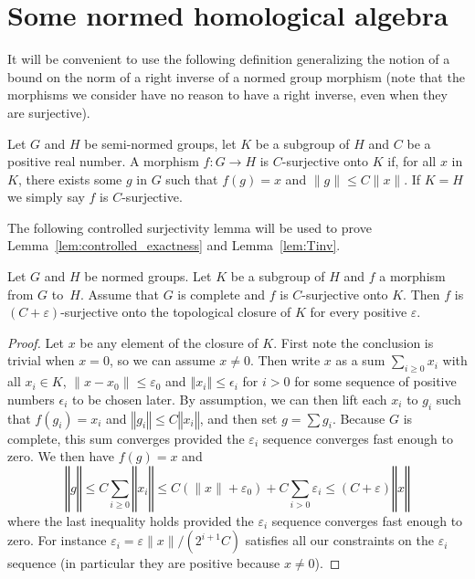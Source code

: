 \section{Some normed homological algebra}%
\label{sec:some_normed_homological_algebra}

It will be convenient to use the following definition generalizing the notion
of a bound on the norm of a right inverse of a normed group morphism (note that
the morphisms we consider have no reason to have a right inverse, even when
they are surjective).

\begin{definition}
  \label{def:surjective_with_bound}
  \leanok
  Let $G$ and $H$ be semi-normed groups, let $K$ be a subgroup of $H$ and $C$ be
  a positive real number.
  A morphism $f : G → H$ is $C$-surjective onto $K$ if, for all $x$ in $K$,
  there exists some $g$ in $G$ such that $f(g) = x$ and $\|g\| ≤ C\|x\|$.
  If $K = H$ we simply say $f$ is $C$-surjective.
\end{definition}

The following controlled surjectivity lemma will be used to prove
Lemma~\ref{lem:controlled_exactness} and Lemma~\ref{lem:Tinv}.

\begin{lemma}
  \label{lem:closure_surjective}
  \leanok
  Let $G$ and $H$ be normed groups.
  Let $K$ be a subgroup of $H$ and $f$ a morphism from $G$ to~$H$.
  Assume that $G$ is complete and $f$ is $C$-surjective onto $K$.
  Then $f$ is $(C + ε)$-surjective onto
  the topological closure of $K$ for every positive $ε$.
\end{lemma}

\begin{proof}\leanok
  Let $x$ be any element of the closure of $K$.
  First note the conclusion is trivial when $x = 0$, so we can assume
  $x ≠ 0$. Then write $x$ as a sum
  $\sum_{i \ge 0} x_i$ with all $x_i \in K$, $\|x - x_0\| ≤ ε_0$ and
  $‖x_i‖\leq \epsilon_i$ for $i>0$ for some sequence of positive numbers
  $\epsilon_i$ to be chosen later.
  By assumption, we can then lift each $x_i$ to $g_i$ such that
  $f(g_i) = x_i$ and $‖g_i‖\leq C‖x_i‖$, and then set
  $g = \sum g_i$. Because $G$ is complete,
  this sum converges provided the $ε_i$ sequence converges fast enough to zero.
  We then have $f(g) = x$ and
  \[
    ‖g‖ ≤ C\sum_{i \geq 0} ‖x_i‖ ≤
    C(\|x\| + ε_0) + C\sum_{i>0} ε_i ≤
    (C + ε)‖x‖
  \]
  where the last inequality holds provided the $ε_i$ sequence converges fast
  enough to zero. For instance $ε_i = ε∥x∥/(2^{i+1}C)$ satisfies all
  our constraints on the $ε_i$ sequence (in particular they are positive
  because $x ≠ 0$).
\end{proof}

